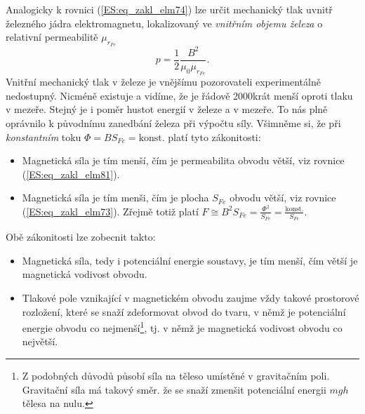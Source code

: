       Analogicky k rovnici (\ref{ES:eq_zakl_elm74}) lze určit mechanický tlak uvnitř železného 
      jádra elektromagnetu, lokalizovaný ve \emph{vnitřním objemu železa} o relativní permeabilitě 
      \(\mu_{r_{Fe}}\)
      \begin{equation}\label{ES:eq_zakl_elm81}
       p = \frac{1}{2}\frac{B^2}{\mu_0\mu_{r_{Fe}}}.
      \end{equation}
      Vnitřní mechanický tlak v železe je vnějšímu pozorovateli experimentálně nedostupný. Nicméně 
      existuje a vidíme, že je řádově 2000krát menší oproti tlaku v mezeře. Stejný je i poměr 
      hustot energií v železe a v mezeře. To nás plně oprávnilo k původnímu zanedbání železa při 
      výpočtu síly. Všimněme si, že při \emph{konstantním} toku \(\Phi = BS_{Fe} = \text{konst}\). 
      platí tyto zákonitosti:
      \begin{itemize}\addtolength{\itemsep}{-0.5\baselineskip}
        \item Magnetická síla je tím menší, čím je permeabilita obvodu větší, viz rovnice     
              (\ref{ES:eq_zakl_elm81}).
        \item Magnetická síla je tím menši, čím je plocha \(S_{Fe}\) obvodu větší, viz rovnice 
              (\ref{ES:eq_zakl_elm73}). Zřejmě totiž platí \(F \cong B^2S_{Fe} = 
              \frac{\Phi^2}{S_{Fe}} = \frac{\text{konst.}}{S_{Fe}}\).
      \end{itemize}
      Obě zákonitosti lze zobecnit takto:
      \begin{itemize}\addtolength{\itemsep}{-0.5\baselineskip}
        \item Magnetická síla, tedy i potenciální energie soustavy, je tím menší, čím větší je    
              magnetická vodivost obvodu.
        \item Tlakové pole vznikající v magnetickém obvodu zaujme vždy takové prostorové rozložení, 
              které se snaží zdeformovat obvod do tvaru, v němž je potenciální energie obvodu co 
              nejmenší\footnote{Z podobných důvodů působí síla na těleso umístěné v gravitačním 
              poli. Gravitační síla má takový směr. že se snaží zmenšit potenciální energii \(mgh\) 
              tělesa na nulu.}, tj. v němž je magnetická vodivost obvodu co největší.
      \end{itemize}
      
